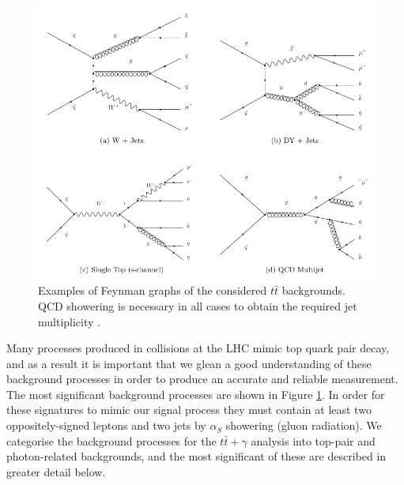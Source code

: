 \begin{figure} [h!]
\begin{center}
\includegraphics[width=\textwidth]{Figures/BackgroundDiagrams.png}
\end{center}
\caption{Examples of Feynman graphs of the considered $t\bar{t}$ backgrounds. QCD showering is necessary in all cases to obtain the required jet multiplicity \cite{ttgammabackgroundestimation}.}
\label{fig-SignalBackgrounds}
\end{figure}

Many processes produced in collisions at the LHC mimic top quark pair decay, and as a result it is important that we glean a good understanding of these background processes in order to produce an accurate and reliable measurement. The most significant background processes are shown in Figure \ref{fig-SignalBackgrounds}. In order for these signatures to mimic our signal process they must contain at least two oppositely-signed leptons and two jets by $\alpha_S$ showering (gluon radiation). We categorise the background processes for the $t\bar{t}+\gamma$ analysis into top-pair and photon-related backgrounds, and the most significant of these are described in greater detail below.

